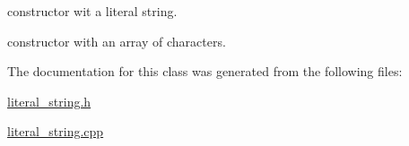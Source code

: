 constructor wit a literal string. 

constructor with an array of characters. 

The documentation for this class was generated from the following files\-:\begin{DoxyCompactItemize}
\item 
\hyperlink{literal__string_8h}{literal\-\_\-string.\-h}\item 
\hyperlink{literal__string_8cpp}{literal\-\_\-string.\-cpp}\end{DoxyCompactItemize}
